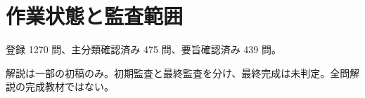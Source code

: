 \chapter{作業状態と監査範囲}
登録 1270 問、主分類確認済み 475 問、要旨確認済み 439 問。
\par 解説は一部の初稿のみ。初期監査と最終監査を分け、最終完成は未判定。全問解説の完成教材ではない。
